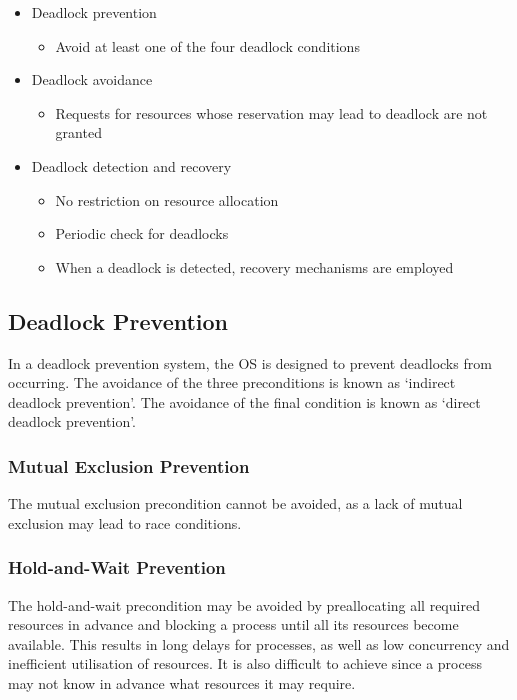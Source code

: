 \begin{itemize}
  \item Deadlock prevention
  \begin{itemize}
    \item Avoid at least one of the four deadlock conditions
  \end{itemize}
  \item Deadlock avoidance
  \begin{itemize}
    \item Requests for resources whose reservation may lead to deadlock are not granted
  \end{itemize}
  \item Deadlock detection and recovery
  \begin{itemize}
    \item No restriction on resource allocation
    \item Periodic check for deadlocks
    \item When a deadlock is detected, recovery mechanisms are employed
  \end{itemize}
\end{itemize}

\subsection{Deadlock Prevention}

In a deadlock prevention system, the OS is designed to prevent deadlocks from occurring.
The avoidance of the three preconditions is known as `indirect deadlock prevention'.
The avoidance of the final condition is known as `direct deadlock prevention'.

\subsubsection{Mutual Exclusion Prevention}

The mutual exclusion precondition cannot be avoided, as a lack of mutual exclusion may lead to race conditions.

\subsubsection{Hold-and-Wait Prevention}

The hold-and-wait precondition may be avoided by preallocating all required resources in advance and blocking a process until all its resources become available.
This results in long delays for processes, as well as low concurrency and inefficient utilisation of resources.
It is also difficult to achieve since a process may not know in advance what resources it may require.

